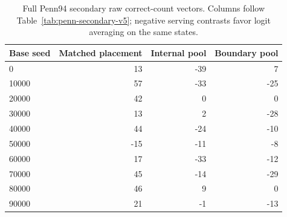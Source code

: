 \begin{table}[t]
\centering\footnotesize\setlength{\tabcolsep}{3pt}
\caption{All frozen Penn94 secondary contrasts. Holm values remain visible but the failed primary conjunction closes their confirmatory family; no practical secondary margin was adopted.}
\label{tab:penn-secondary-v5}
\end{table}
\begin{table}[t]
\centering\footnotesize\setlength{\tabcolsep}{3pt}
\caption{Full Penn94 secondary raw correct-count vectors. Columns follow Table~\ref{tab:penn-secondary-v5}; negative serving contrasts favor logit averaging on the same states.}
\label{tab:penn-secondary-vectors-v5}
\begin{tabular}{lrrr}
\toprule
Base seed & Matched placement & Internal pool & Boundary pool\\
\midrule
0 & 13 & -39 & 7\\
10000 & 57 & -33 & -25\\
20000 & 42 & 0 & 0\\
30000 & 13 & 2 & -28\\
40000 & 44 & -24 & -10\\
50000 & -15 & -11 & -8\\
60000 & 17 & -33 & -12\\
70000 & 45 & -14 & -29\\
80000 & 46 & 9 & 0\\
90000 & 21 & -1 & -13\\
\bottomrule
\end{tabular}
\end{table}
